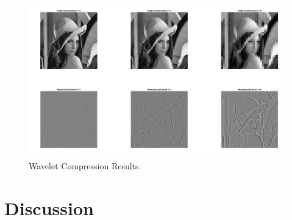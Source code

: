 \documentclass[./rarnold_project6.tex]{subfiles}
\begin{document}
	\begin{figure}[!htbp]
	\centering
	\includegraphics[scale=0.33]{"wavelet"}
	\captionsetup{justification=centering}
	\caption{Wavelet Compression Results.} 
	\label{wavelet}
	\end{figure}
	
	\clearpage
	
  	
\section*{Discussion}
\end{document}
